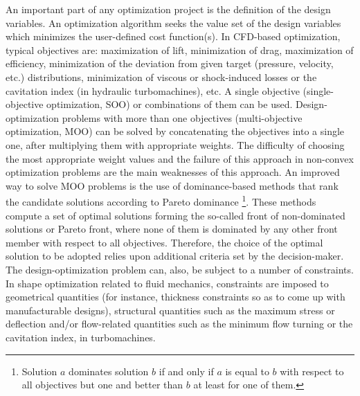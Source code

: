 An important part of any optimization project is the definition of the design variables. An optimization algorithm seeks the value set of the design variables which minimizes the user-defined cost function(s).  In CFD-based optimization, typical objectives are: maximization of lift,  minimization of drag,  maximization of efficiency, minimization of the deviation from given target (pressure, velocity, etc.) distributions, minimization of viscous or shock-induced losses or the cavitation index (in hydraulic turbomachines), etc. A single objective (single-objective optimization, SOO) or combinations of them can be used. Design-optimization problems with more than one objectives (multi-objective optimization, MOO) can be solved by concatenating the objectives into a single one, after multiplying them with appropriate weights. The difficulty of choosing the most appropriate weight values and the failure of this approach in non-convex optimization problems are the main weaknesses of this approach.  An improved way to solve MOO problems is the use of dominance-based methods that rank the candidate solutions according to Pareto dominance \footnote{Solution $a$ dominates solution $b$ if and only if $a$ is equal to $b$ with respect to all objectives but one and better than $b$ at least for one of them.}. These methods compute a set of optimal solutions forming the so-called front of non-dominated solutions or Pareto front, where none of them is dominated by any other front member with respect to all objectives.  Therefore, the choice of the optimal solution to be adopted relies upon additional criteria set by the decision-maker.  The design-optimization problem can, also, be subject to a number of constraints. In shape optimization related to fluid mechanics, constraints are imposed to geometrical quantities (for instance, thickness constraints so as to come up with manufacturable designs), structural quantities such as the maximum stress or deflection and/or flow-related quantities such as the minimum flow turning or the cavitation index, in turbomachines.          

